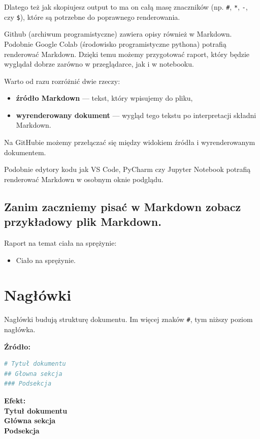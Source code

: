 \documentclass[12pt, a4paper]{article}
\begin{document}
Dlatego też jak skopiujesz output to ma on całą masę znaczników (np. \texttt{\#}, \texttt{*}, \texttt{-}, czy \texttt{\$}), które są potrzebne do poprawnego renderowania.

Github (archiwum programistyczne) zawiera opisy również w Markdown. Podobnie Google Colab (środowisko programistyczne pythona) potrafią renderować Markdown. Dzięki temu możemy przygotować raport, który będzie wyglądał dobrze zarówno w przeglądarce, jak i w notebooku.

Warto od razu rozróżnić dwie rzeczy:
\begin{itemize}
    \item \textbf{źródło Markdown} --- tekst, który wpisujemy do pliku,
    \item \textbf{wyrenderowany dokument} --- wygląd tego tekstu po interpretacji składni Markdown.
\end{itemize}

Na GitHubie możemy przełączać się między widokiem źródła i wyrenderowanym dokumentem. 

Podobnie edytory kodu jak VS Code, PyCharm czy Jupyter Notebook potrafią renderować Markdown w osobnym oknie podglądu.

\subsection{Zanim zaczniemy pisać w Markdown zobacz przykładowy plik Markdown.}
Raport na temat ciała na sprężynie: 
\begin{itemize}
    \item \glqq Ciało na sprężynie\grqq{}. 
\end{itemize}


\section{Nagłówki}
Nagłówki budują strukturę dokumentu. Im więcej znaków \texttt{\#}, tym niższy poziom nagłówka.

\textbf{Źródło:}
\begin{lstlisting}[language=bash]
# Tytuł dokumentu
## Głowna sekcja
### Podsekcja
\end{lstlisting}

\textbf{Efekt:} \\
{\Large \textbf{Tytuł dokumentu}} \\
{\large \textbf{Główna sekcja}} \\
{\normalsize \textbf{Podsekcja}}
\end{document}
